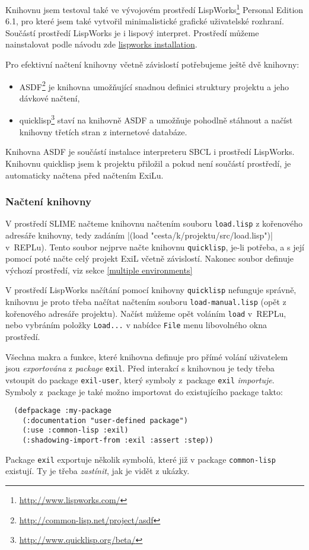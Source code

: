 Knihovnu jsem testoval také ve vývojovém prostředí
LispWorks\registered\footnote{\url{http://www.lispworks.com/}} Personal Edition 6.1,
pro které jsem také vytvořil minimalistické grafické uživatelské rozhraní.
Součástí prostředí LispWorks je i lispový interpret. Prostředí můžeme nainstalovat
podle návodu zde \url{lispworks installation}.

Pro efektivní načtení knihovny včetně závislostí potřebujeme ještě dvě knihovny:
\begin{itemize}
  \item ASDF\footnote{\url{http://common-lisp.net/project/asdf}} je knihovna
    umožňující snadnou definici struktury projektu a jeho dávkové načtení,
  \item quicklisp\footnote{\url{http://www.quicklisp.org/beta/}} staví na knihovně
    ASDF a umožňuje pohodlně stáhnout a načíst knihovny třetích stran z internetové
    databáze.
\end{itemize}
Knihovna ASDF je součástí instalace interpreteru SBCL i prostředí LispWorks.
Knihovnu quicklisp jsem k projektu přiložil a pokud není součástí prostředí, je
automaticky načtena před načtením ExiLu.
\subsubsection{Načtení knihovny}
V prostředí SLIME načteme knihovnu načtením souboru \verb|load.lisp| z kořenového
adresáře knihovny, tedy zadáním \cl|(load "cesta/k/projektu/src/load.lisp")|
v~REPLu). Tento soubor nejprve načte knihovnu \verb|quicklisp|, je-li potřeba,
a s její pomocí poté načte celý projekt ExiL včetně závislostí. Nakonec soubor
definuje výchozí prostředí, viz sekce \ref{multiple environments}

V prostředí LispWorks načítání pomocí knihovny \verb|quicklisp| nefunguje správně,
knihovnu je proto třeba načítat načtením souboru \verb|load-manual.lisp| (opět
z kořenového adresáře projektu). Načíst můžeme opět voláním \verb|load| v~REPLu,
nebo vybráním položky \verb|Load...| v nabídce \verb|File| menu libovolného okna
prostředí.

Všechna makra a funkce, které knihovna definuje pro přímé volání uživatelem jsou
\emph{exportována} z \emph{package} \verb|exil|. Před interakcí s knihovnou je
tedy třeba vstoupit do package \verb|exil-user|, který symboly z~package
\verb|exil| \emph{importuje}. Symboly z~package je také možno importovat do
existujícího package takto:
\begin{verbatim}
  (defpackage :my-package
    (:documentation "user-defined package")
    (:use :common-lisp :exil)
    (:shadowing-import-from :exil :assert :step))
\end{verbatim}
Package \verb|exil| exportuje několik symbolů, které již v package
\verb|common-lisp| existují. Ty je třeba \emph{zastínit}, jak je vidět z ukázky.
